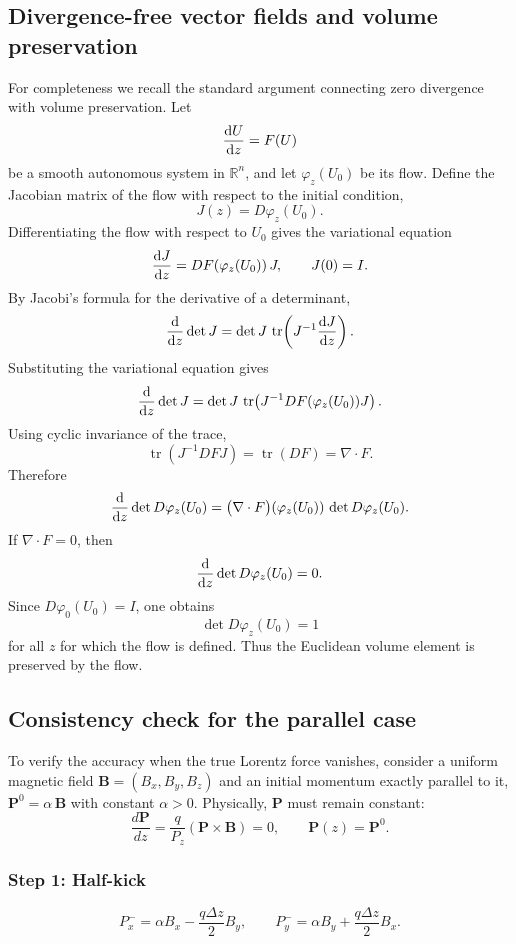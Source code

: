 \subsection{Divergence-free vector fields and volume preservation}
\label{boris:sec:liouville}

For completeness we recall the standard argument connecting zero divergence
with volume preservation.  Let
\[
\frac{\text{d} {U}}{\text{d} {z}}=F(U)
\]
be a smooth autonomous system in \(\mathbb R^n\), and let
\(\varphi_z(U_0)\) be its flow.  Define the Jacobian matrix of the flow with
respect to the initial condition,
\[
J(z)=D\varphi_z(U_0).
\]
Differentiating the flow with respect to \(U_0\) gives the variational equation
\[
\frac{\text{d} {J}}{\text{d} {z}}=DF(\varphi_z(U_0))\,J,
\qquad
J(0)=I.
\]
By Jacobi's formula for the derivative of a determinant,
\[
\frac{\text{d} {}}{\text{d} {z}}\det J
=\det J\,
\operatorname{tr}\!\left(J^{-1}\frac{\text{d} {J}}{\text{d} {z}}\right).
\]
Substituting the variational equation gives
\[
\frac{\text{d} {}}{\text{d} {z}}\det J
=\det J\,
\operatorname{tr}\!\left(J^{-1}DF(\varphi_z(U_0))J\right).
\]
Using cyclic invariance of the trace,
\[
\operatorname{tr}\!\left(J^{-1}DFJ\right)
=\operatorname{tr}(DF)
=\nabla\cdot F.
\]
Therefore
\[
\frac{\text{d} {}}{\text{d} {z}}\det D\varphi_z(U_0)
=
\bigl(\nabla\cdot F\bigr)(\varphi_z(U_0))\,
\det D\varphi_z(U_0).
\]
If \(\nabla\cdot F=0\), then
\[
\frac{\text{d} {}}{\text{d} {z}}\det D\varphi_z(U_0)=0.
\]
Since \(D\varphi_0(U_0)=I\), one obtains
\[
\det D\varphi_z(U_0)=1
\]
for all \(z\) for which the flow is defined.  Thus the Euclidean volume
element is preserved by the flow.

\subsection{Consistency check for the parallel case}
\label{boris:sec:parallelcase}

To verify the accuracy when the true Lorentz force vanishes, consider a
uniform magnetic field \(\bm{B}=(B_x,B_y,B_z)\) and an initial momentum
exactly parallel to it, \(\bm{P}^0 = \alpha\,\bm{B}\) with constant
\(\alpha>0\).
Physically, \(\bm{P}\) must remain constant:
\[
\frac{d\bm{P}}{dz}=\frac{q}{P_z}(\bm{P}\times\bm{B})=0,
\qquad
\bm{P}(z)=\bm{P}^0.
\]

\subsubsection{Step 1: Half-kick}
\[
P_x^- = \alpha B_x - \frac{q\Delta z}{2} B_y, \qquad
P_y^- = \alpha B_y + \frac{q\Delta z}{2} B_x .
\]

